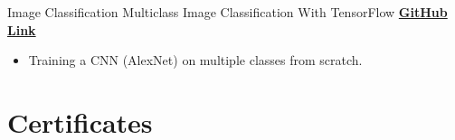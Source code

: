 \documentclass[letterpaper]{DS_class_file} %
\begin{document}
\begin{twenty}
	\twentyitem
	{Image}
	{Classification}
	{\hspace{0.3cm}Multiclass Image Classification With TensorFlow}
	{\href{https://github.com/MuhammedBuyukkinaci/TensorFlow-Multiclass-Image-Classification-using-CNN-s}{\textbf{GitHub Link}}}
	{}
	{
		{\begin{itemize}
				\item Training a CNN (AlexNet) on multiple classes from scratch.
		\end{itemize}}
	}
	
	
\end{twenty}

\section{Certificates}
\end{document}
